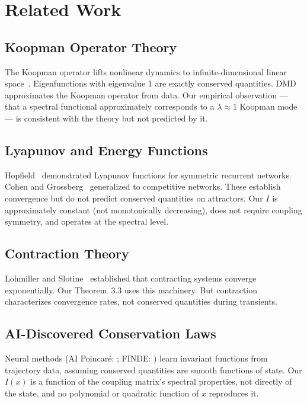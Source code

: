 \documentclass[11pt]{article}
\begin{document}
\section{Related Work}

\subsection{Koopman Operator Theory}

The Koopman operator lifts nonlinear dynamics to infinite-dimensional linear space~\citep{mezic2005}. Eigenfunctions with eigenvalue 1 are exactly conserved quantities. DMD~\citep{schmid2010, tu2014} approximates the Koopman operator from data. Our empirical observation --- that a spectral functional approximately corresponds to a $\lambda \approx 1$ Koopman mode --- is consistent with the theory but not predicted by it.

\subsection{Lyapunov and Energy Functions}

Hopfield~\citeyear{hopfield1982} demonstrated Lyapunov functions for symmetric recurrent networks. Cohen and Grossberg~\citeyear{cohen1983} generalized to competitive networks. These establish convergence but do not predict conserved quantities on attractors. Our $I$ is approximately constant (not monotonically decreasing), does not require coupling symmetry, and operates at the spectral level.

\subsection{Contraction Theory}

Lohmiller and Slotine~\citeyear{lohmiller1998} established that contracting systems converge exponentially. Our Theorem~3.3 uses this machinery. But contraction characterizes convergence rates, not conserved quantities during transients.

\subsection{AI-Discovered Conservation Laws}

Neural methods (AI Poincar\'e: \citealt{liu2021}; FINDE: \citealt{matsubara2024}) learn invariant functions from trajectory data, assuming conserved quantities are smooth functions of state. Our $I(x)$ is a function of the coupling matrix's spectral properties, not directly of the state, and no polynomial or quadratic function of $x$ reproduces it.
\end{document}
